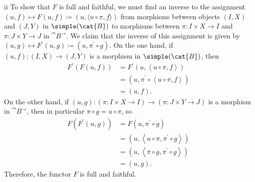 \begin{partsolution}{ii}
To show that \(F\) is full and faithful, we must find an inverse to the assignment \((u,f) \mapsto F(u, f) \coloneq (u, \langle u\circ\pi,f\rangle)\) from morphisms between objects \((I, X)\) and \((J, Y)\) in \(\simple(\cat{B})\) to morphisms between \(\pi : I \times X \to I\) and \(\pi : J \times Y \to J\) in \(\cat{B}^\rightarrow\).
We claim that the inverse of this assignment is given by \((u, g) \mapsto F^\prime(u, g) \coloneq (u, \pi^\prime \circ g)\).
On the one hand, if \((u, f) : (I, X) \to (J, Y)\) is a morphism in \(\simple(\cat{B})\), then
\begin{align*}
F^\prime(F(u, f))
&= F^\prime\left(u, \left\langle u\circ\pi,f\right\rangle\right) \\
&= \left(u, \pi^\prime \circ \left\langle u\circ\pi,f\right\rangle\right) \\
&= (u, f).
\end{align*}
On the other hand, if \((u, g) : (\pi : I \times X \to I) \to (\pi : J \times Y \to J)\) is a morphism in \(\cat{B}^\rightarrow\), then in particular \(\pi \circ g = u \circ \pi\), so
\begin{align*}
F(F^\prime(u, g))
&= F\left(u, \pi^\prime \circ g\right) \\
&= \left(u, \left\langle u\circ\pi, \pi^\prime \circ g\right\rangle\right) \\
&= \left(u, \left\langle \pi \circ g, \pi^\prime \circ g\right\rangle\right) \\
&= (u, g).
\end{align*}
Therefore, the functor \(F\) is full and faithful.


\end{partsolution}
